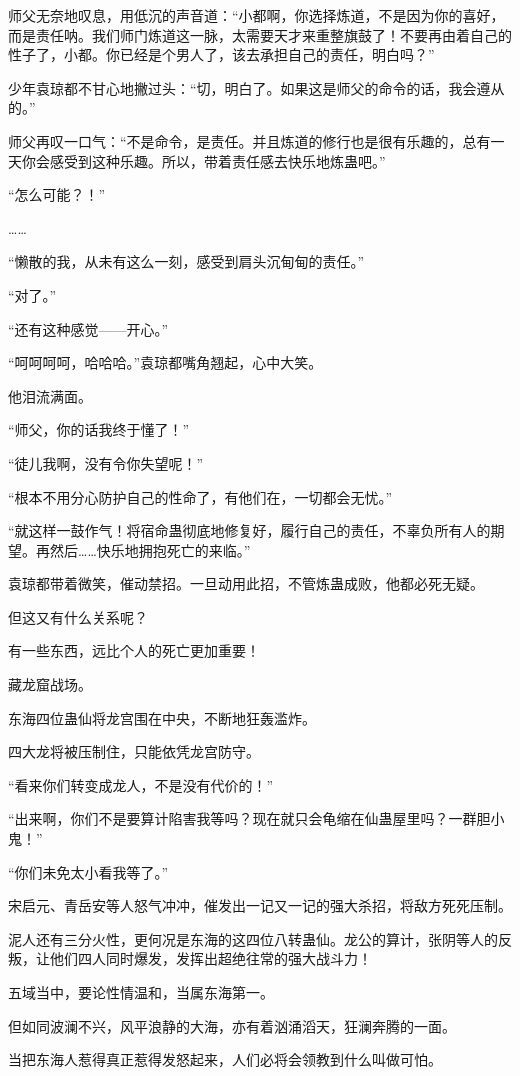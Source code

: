 \begin{this_body}
师父无奈地叹息，用低沉的声音道：“小都啊，你选择炼道，不是因为你的喜好，而是责任呐。我们师门炼道这一脉，太需要天才来重整旗鼓了！不要再由着自己的性子了，小都。你已经是个男人了，该去承担自己的责任，明白吗？”

少年袁琼都不甘心地撇过头：“切，明白了。如果这是师父的命令的话，我会遵从的。”

师父再叹一口气：“不是命令，是责任。并且炼道的修行也是很有乐趣的，总有一天你会感受到这种乐趣。所以，带着责任感去快乐地炼蛊吧。”

“怎么可能？！”

……

“懒散的我，从未有这么一刻，感受到肩头沉甸甸的责任。”

“对了。”

“还有这种感觉——开心。”

“呵呵呵呵，哈哈哈。”袁琼都嘴角翘起，心中大笑。

他泪流满面。

“师父，你的话我终于懂了！”

“徒儿我啊，没有令你失望呢！”

“根本不用分心防护自己的性命了，有他们在，一切都会无忧。”

“就这样一鼓作气！将宿命蛊彻底地修复好，履行自己的责任，不辜负所有人的期望。再然后……快乐地拥抱死亡的来临。”

袁琼都带着微笑，催动禁招。一旦动用此招，不管炼蛊成败，他都必死无疑。

但这又有什么关系呢？

有一些东西，远比个人的死亡更加重要！

藏龙窟战场。

东海四位蛊仙将龙宫围在中央，不断地狂轰滥炸。

四大龙将被压制住，只能依凭龙宫防守。

“看来你们转变成龙人，不是没有代价的！”

“出来啊，你们不是要算计陷害我等吗？现在就只会龟缩在仙蛊屋里吗？一群胆小鬼！”

“你们未免太小看我等了。”

宋启元、青岳安等人怒气冲冲，催发出一记又一记的强大杀招，将敌方死死压制。

泥人还有三分火性，更何况是东海的这四位八转蛊仙。龙公的算计，张阴等人的反叛，让他们四人同时爆发，发挥出超绝往常的强大战斗力！

五域当中，要论性情温和，当属东海第一。

但如同波澜不兴，风平浪静的大海，亦有着汹涌滔天，狂澜奔腾的一面。

当把东海人惹得真正惹得发怒起来，人们必将会领教到什么叫做可怕。


\end{this_body}

